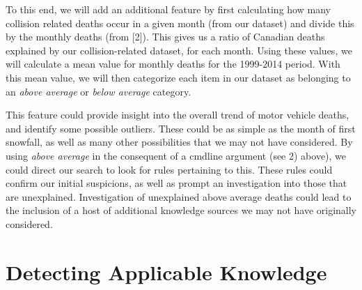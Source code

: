 \documentclass{amsart}
\theoremstyle{definition}
\theoremstyle{remark}
\numberwithin{equation}{section}
\begin{document}
\begin{enumerate}
To this end, we will add an additional feature by first calculating how many collision related deaths occur in a given month (from our dataset) and divide this by the monthly deaths (from [2]). This gives us a ratio of Canadian deaths explained by our collision-related dataset, for each month. Using these values, we will calculate a mean value for monthly deaths for the 1999-2014 period. With this mean value, we will then categorize each item in our dataset as belonging to an \textit{above average} or \textit{below average} category. 

This feature could provide insight into the overall trend of motor vehicle deaths, and identify some possible outliers. These could be as simple as the month of first snowfall, as well as many other possibilities that we may not have considered. By using \textit{above average} in the consequent of a cmdline argument (see 2) above), we could direct our search to look for rules pertaining to this. These rules could confirm our initial suspicions, as well as prompt an investigation into those that are unexplained. Investigation of unexplained above average deaths could lead to the inclusion of a host of additional knowledge sources we may not have originally considered.
\end{enumerate}

\section{Detecting Applicable Knowledge}
\end{document}
